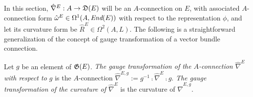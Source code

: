In this section, $\hat \nabla^E: A \to \mathfrak{D}(E)$ will be an $A$-connection on $E$, with associated $A$-connection form $\hat \omega^E \in \Omega^1(A, \operatorname{\textit{End}}(E))$ with respect to the representation $\phi$, and let its curvature form be $\hat R^E \in \Omega^2(A, L)$. The following is a straightforward generalization of the concept of gauge transformation of a vector bundle connection.

\begin{definition}
Let $g$ be an element of $\mathfrak{G}(E)$. \emph{The gauge transformation of the $A$-connection $\hat \nabla^E$ with respect to $g$} is the $A$-connection $\hat \nabla^{E, g} := g^{-1} \comp \hat \nabla^E \comp g$. \emph{The gauge transformation of the curvature of $\hat \nabla^E$} is the curvature of $\hat \nabla^{E,g}$.
\end{definition}


